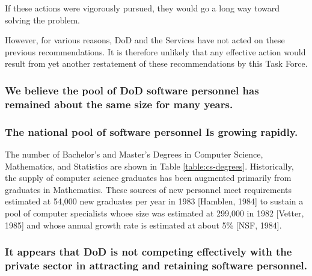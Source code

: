 \documentclass[12pt,final]{article}
\begin{document}
If these actions were vigorously pursued, they would go a long way toward
solving the problem.

However, for various reasons, DoD and the Services have not acted on these
previous recommendations. It is therefore unlikely that any effective action
would result from yet another restatement of these recommendations by this Task
Force.

\subsubsection*{We believe the pool of DoD software personnel has remained about the same size
for many years.}

\subsubsection*{The national pool of software personnel Is growing rapidly.}

The number of Bachelor’s and Master’s Degrees in Computer Science, Mathematics,
and Statistics are shown in Table \ref{table:cs-degrees}. Historically, the
supply of computer science graduates has been augmented primarily from
graduates in Mathematics. These sources of new personnel meet requirements
estimated at 54,000 new graduates per year in 1983 [Hamblen, 1984] to sustain a
pool of computer specialists whoee size was estimated at 299,000 in 1982
[Vetter, 1985] and whose annual growth rate is estimated at about 5\% [NSF,
1984].

\subsubsection*{It appears that DoD is not competing effectively with the
private sector in attracting and retaining software personnel.}

\addtocounter{section}{-1}
\end{document}
